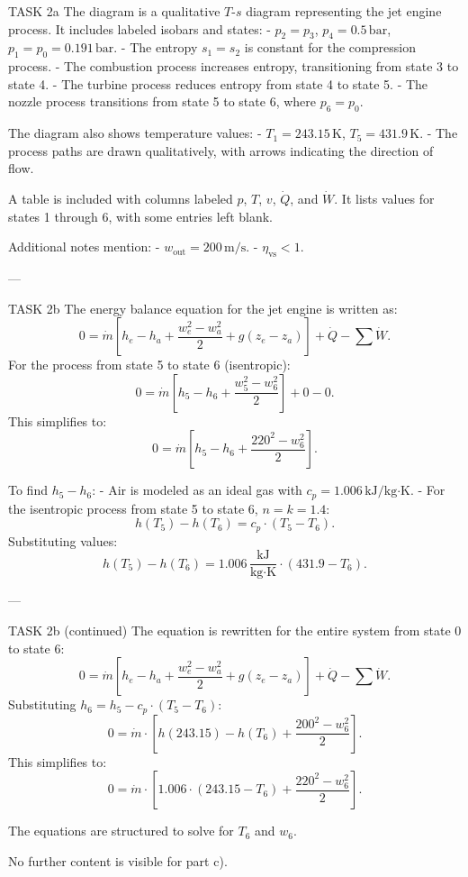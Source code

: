 TASK 2a  
The diagram is a qualitative \( T \)-\( s \) diagram representing the jet engine process. It includes labeled isobars and states:  
- \( p_2 = p_3 \), \( p_4 = 0.5 \, \text{bar} \), \( p_1 = p_0 = 0.191 \, \text{bar} \).  
- The entropy \( s_1 = s_2 \) is constant for the compression process.  
- The combustion process increases entropy, transitioning from state 3 to state 4.  
- The turbine process reduces entropy from state 4 to state 5.  
- The nozzle process transitions from state 5 to state 6, where \( p_6 = p_0 \).  

The diagram also shows temperature values:  
- \( T_1 = 243.15 \, \text{K} \), \( T_5 = 431.9 \, \text{K} \).  
- The process paths are drawn qualitatively, with arrows indicating the direction of flow.  

A table is included with columns labeled \( p \), \( T \), \( v \), \( \dot{Q} \), and \( \dot{W} \). It lists values for states 1 through 6, with some entries left blank.  

Additional notes mention:  
- \( w_{\text{out}} = 200 \, \text{m/s} \).  
- \( \eta_{\text{vs}} < 1 \).  

---

TASK 2b  
The energy balance equation for the jet engine is written as:  
\[
0 = \dot{m} \left[ h_e - h_a + \frac{w_e^2 - w_a^2}{2} + g(z_e - z_a) \right] + \dot{Q} - \sum \dot{W}.
\]  
For the process from state 5 to state 6 (isentropic):  
\[
0 = \dot{m} \left[ h_5 - h_6 + \frac{w_5^2 - w_6^2}{2} \right] + 0 - 0.
\]  
This simplifies to:  
\[
0 = \dot{m} \left[ h_5 - h_6 + \frac{220^2 - w_6^2}{2} \right].
\]  

To find \( h_5 - h_6 \):  
- Air is modeled as an ideal gas with \( c_p = 1.006 \, \text{kJ/kg·K} \).  
- For the isentropic process from state 5 to state 6, \( n = k = 1.4 \):  
\[
h(T_5) - h(T_6) = c_p \cdot (T_5 - T_6).
\]  
Substituting values:  
\[
h(T_5) - h(T_6) = 1.006 \, \frac{\text{kJ}}{\text{kg·K}} \cdot (431.9 - T_6).
\]  

---

TASK 2b (continued)  
The equation is rewritten for the entire system from state 0 to state 6:  
\[
0 = \dot{m} \left[ h_e - h_a + \frac{w_e^2 - w_a^2}{2} + g(z_e - z_a) \right] + \dot{Q} - \sum \dot{W}.
\]  
Substituting \( h_6 = h_5 - c_p \cdot (T_5 - T_6) \):  
\[
0 = \dot{m} \cdot \left[ h(243.15) - h(T_6) + \frac{200^2 - w_6^2}{2} \right].
\]  
This simplifies to:  
\[
0 = \dot{m} \cdot \left[ 1.006 \cdot (243.15 - T_6) + \frac{220^2 - w_6^2}{2} \right].
\]  

The equations are structured to solve for \( T_6 \) and \( w_6 \).  

No further content is visible for part c).